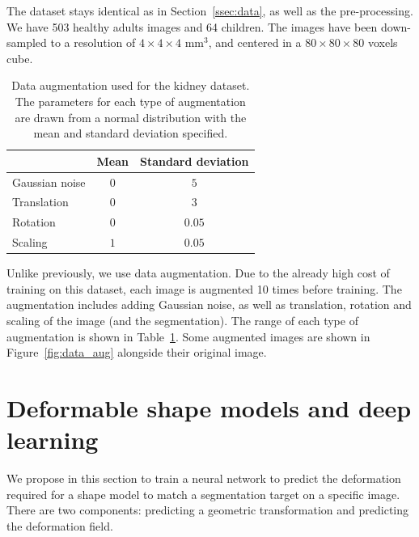 The dataset stays identical as in Section~\ref{ssec:data}, as well as the pre-processing. We have 503 healthy adults images and 64 children. The images have been down-sampled to a resolution of $4 \times 4 \times 4$ mm$^3$, and centered in a $80 \times 80 \times 80$ voxels cube. 

\begin{table}[htb]
	\centering
	\begin{tabular}{|l|c|c|}
	    \hline
                        & Mean & Standard deviation \\
        \hline
         Gaussian noise & $0$ & $5$ \\
         Translation & $0$ & $3$ \\
         Rotation & $0$ & $0.05$ \\
         Scaling & $1$ & $0.05$ \\
        \hline
    \end{tabular}
	\caption{Data augmentation used for the kidney dataset. The parameters for each type of augmentation are drawn from a normal distribution with the mean and standard deviation specified.}
	\label{table:data_aug}
\end{table}

Unlike previously, we use data augmentation. Due to the already high cost of training on this dataset, each image is augmented 10 times before training. The augmentation includes adding Gaussian noise, as well as translation, rotation and scaling of the image (and the segmentation). The range of each type of augmentation is shown in Table~\ref{table:data_aug}. Some augmented images are shown in Figure~\ref{fig:data_aug} alongside their original image.

\section{Deformable shape models and deep learning}
\label{sec:deformable_dl}

We propose in this section to train a neural network to predict the deformation required for a shape model to match a segmentation target on a specific image. There are two components: predicting a geometric transformation and predicting the deformation field.

